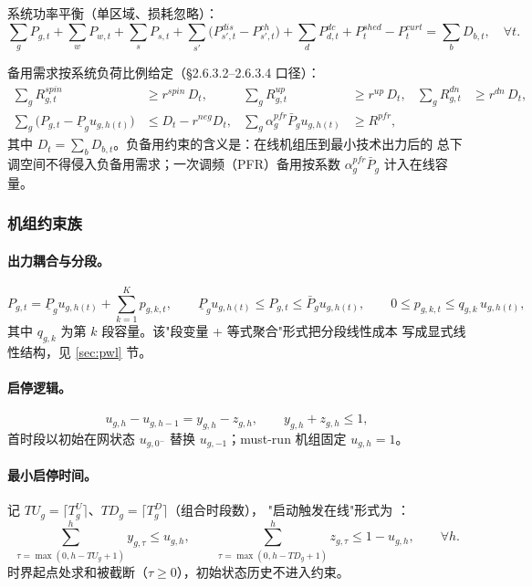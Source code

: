 系统功率平衡（单区域、损耗忽略）：
\begin{equation}
\sum_g P_{g,t}+\sum_w P_{w,t}+\sum_s P_{s,t}
+\sum_{s'}\big(P^{dis}_{s',t}-P^{ch}_{s',t}\big)+\sum_d P^{dc}_{d,t}
+P^{shed}_t-P^{curt}_t=\sum_b D_{b,t},\quad \forall t.
\label{eq:balance}
\end{equation}

备用需求按系统负荷比例给定（§2.6.3.2--2.6.3.4 口径）：
\begin{align}
\sum_g R^{spin}_{g,t}&\ge r^{spin}\,D_t, &
\sum_g R^{up}_{g,t}&\ge r^{up}\,D_t, &
\sum_g R^{dn}_{g,t}&\ge r^{dn}\,D_t, \label{eq:reserve}\\
\sum_g \big(P_{g,t}-\underline P_g u_{g,h(t)}\big)&\le D_t - r^{neg}D_t, &
\sum_g \alpha^{pfr}_g \bar P_g u_{g,h(t)}&\ge R^{pfr}, && \nonumber
\end{align}
其中 $D_t=\sum_b D_{b,t}$。负备用约束的含义是：在线机组压到最小技术出力后的
总下调空间不得侵入负备用需求；一次调频（PFR）备用按系数
$\alpha^{pfr}_g\bar P_g$ 计入在线容量。

\subsubsection{机组约束族}

\paragraph{出力耦合与分段。}
\begin{equation}
P_{g,t}=\underline P_g u_{g,h(t)}+\sum_{k=1}^{K} p_{g,k,t},\qquad
\underline P_g u_{g,h(t)}\le P_{g,t}\le \bar P_g u_{g,h(t)},\qquad
0\le p_{g,k,t}\le q_{g,k}\,u_{g,h(t)},
\label{eq:gen-coupling}
\end{equation}
其中 $q_{g,k}$ 为第 $k$ 段容量。该"段变量 + 等式聚合"形式把分段线性成本
写成显式线性结构，见 \ref{sec:pwl} 节。

\paragraph{启停逻辑。}
\begin{equation}
u_{g,h}-u_{g,h-1}=y_{g,h}-z_{g,h},\qquad y_{g,h}+z_{g,h}\le 1,
\label{eq:logic}
\end{equation}
首时段以初始在网状态 $u_{g,0^-}$ 替换 $u_{g,-1}$；must-run 机组固定
$u_{g,h}=1$。

\paragraph{最小启停时间。}
记 $TU_g=\lceil T^U_g\rceil$、$TD_g=\lceil T^D_g\rceil$（组合时段数），
"启动触发在线"形式为 \cite{ostrowski2012}：
\begin{equation}
\sum_{\tau=\max(0,h-TU_g+1)}^{h} y_{g,\tau}\le u_{g,h},\qquad
\sum_{\tau=\max(0,h-TD_g+1)}^{h} z_{g,\tau}\le 1-u_{g,h},\qquad \forall h.
\label{eq:minupdown}
\end{equation}
时界起点处求和被截断（$\tau\ge 0$），初始状态历史不进入约束。

